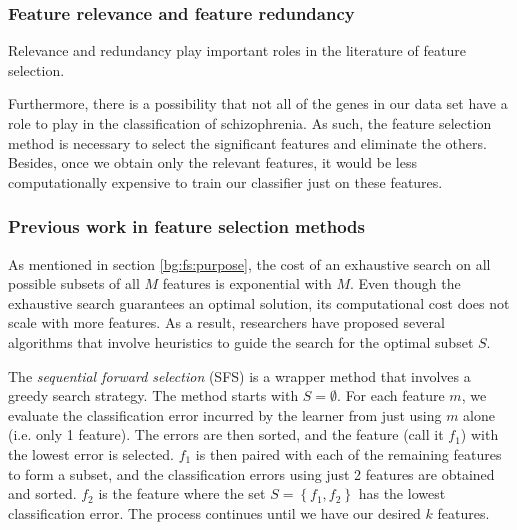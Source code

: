 \documentclass[12pt, twoside, a4paper]{article}
\begin{document}
\subsubsection{Feature relevance and feature redundancy} \label{bg:fs:relevance}

Relevance and redundancy play important roles in the literature of feature selection.




Furthermore, there is a possibility that not all of the genes in our data set have a role to play in the classification of schizophrenia. As such, the feature selection method is necessary to select the significant features and eliminate the others. Besides, once we obtain only the relevant features, it would be less computationally expensive to train our classifier just on these features.

\subsubsection{Previous work in feature selection methods} \label{bg:fs:previous}

As mentioned in section \ref{bg:fs:purpose}, the cost of an exhaustive search on all possible subsets of all $M$ features is exponential with $M$. Even though the exhaustive search guarantees an optimal solution, its computational cost does not scale with more features. As a result, researchers have proposed several algorithms that involve heuristics to guide the search for the optimal subset $S$.

The \textit{sequential forward selection} (SFS) \cite{RefWorks:177} is a wrapper method that involves a greedy search strategy. The method starts with $S=\emptyset$. For each feature $m$, we evaluate the classification error incurred by the learner from just using $m$ alone (i.e. only 1 feature). The errors are then sorted, and the feature (call it $f_1$) with the lowest error is selected. $f_1$ is then paired with each of the remaining features to form a subset, and the classification errors using just 2 features are obtained and sorted. $f_2$ is the feature where the set $S= \left\lbrace f_1, f_2 \right\rbrace$ has the lowest classification error. The process continues until we have our desired $k$ features.
  
\end{document}
